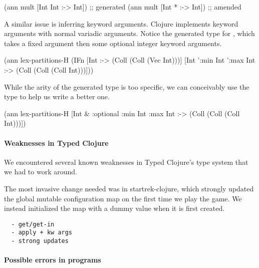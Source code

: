 \begin{cljlisting}
(ann mult [Int Int :-> Int]) ;; generated
(ann mult [Int * :-> Int])   ;; amended
\end{cljlisting}

A similar issue is inferring keyword arguments. Clojure implements
keyword arguments with normal variadic arguments. Notice
the generated type for ,
which takes a fixed argument then some optional integer keyword
arguments. 

\begin{cljlisting}
(ann lex-partitions-H
	(IFn [Int :-> (Coll (Coll (Vec Int)))]
		   [Int ':min Int ':max Int :-> (Coll (Coll (Coll Int)))]))
\end{cljlisting}

While the arity of the generated type is too specific,
we can conceivably use the type to help us write a better one.

\begin{cljlisting}
(ann lex-partitions-H [Int & :optional {:min Int :max Int} :-> (Coll (Coll (Coll Int)))])
\end{cljlisting}

\paragraph{Weaknesses in Typed Clojure}

We encountered several known weaknesses in Typed Clojure's type system
that we had to work around.

The most invasive change needed was in startrek-clojure, which
strongly updated the global mutable configuration map on the first
time we play the game. We instead initialized the map with a dummy
value when it is first created.

\begin{verbatim}
  - get/get-in
  - apply + kw args
  - strong updates
\end{verbatim}

\paragraph{Possible errors in programs}

